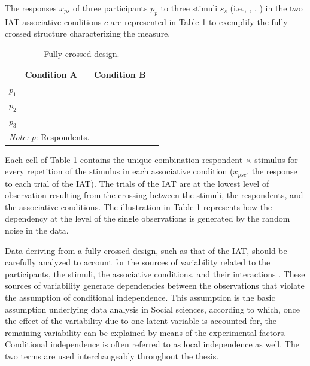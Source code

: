 \documentclass[12pt]{book}
\begin{document}
The responses $x_{ps}$ of three participants $p_p$ to three stimuli $s_s$ (i.e., \Cat, \Snowman[1.5], \NiceReapey) in the two IAT associative conditions $c$ are represented in Table \ref{tab:fully} to exemplify the fully-crossed structure characterizing the measure.  
\begin{table}[h!]
	\caption{Fully-crossed design.}
	\label{tab:fully} \centering \onehalfspacing
	\begin{tabular}{p{1cm} p{0.05cm} p{1.5cm} p{1.5cm} p{1.5cm} p{0.05cm} p{1.5cm} p{1.5cm} p{1.5cm}}
		\toprule
		& \multicolumn{3}{c}{Condition A} & & \multicolumn{3}{c}{Condition B}\\
		\midrule
		\multirow{2}{*}{$p_1$} &  \multicolumn{1}{|c}{} & \Cat[2] & \Snowman[2.5] & \NiceReapey[2] & &  \Cat[2]  & \Snowman[2.5] & \NiceReapey[2] \\
		&  \multicolumn{1}{|c}{} & \Cat[2] & \Snowman[2.5] & \NiceReapey[2] & & \Cat[2] & \Snowman[2.5] & \NiceReapey[2] \\
		\hline
		\multirow{2}{*}{$p_2$} &  \multicolumn{1}{|c}{} & \Cat[2] & \Snowman[2.5] & \NiceReapey[2] & & \Cat[2] & \Snowman[2.5] & \NiceReapey[2] \\
		& \multicolumn{1}{|c}{} & \Cat[2] & \Snowman[2.5] & \NiceReapey[2] & & \Cat[2] & \Snowman[2.5] & \NiceReapey[2] \\
		\hline
		\multirow{2}{*}{$p_3$} & \multicolumn{1}{|c}{} & \Cat[2] & \Snowman[2.5] & \NiceReapey[2] & & \Cat[2] & \Snowman[2.5] & \NiceReapey[2] \\
		& \multicolumn{1}{|c}{} & \Cat[2] & \Snowman[2.5] & \NiceReapey[2] & & \Cat[2] & \Snowman[2.5] & \NiceReapey[2] \\
		\bottomrule
		\multicolumn{8}{p{10cm}}{\emph{Note:} $p$: Respondents.}
	\end{tabular}
\end{table}
Each cell of Table \ref{tab:fully} contains the unique combination respondent $\times$ stimulus for every repetition of the stimulus in each associative condition ($x_{psc}$, the response to each  trial of the IAT). 
The trials of the IAT are at the lowest level of observation resulting from the crossing between the stimuli, the respondents, and the associative conditions.
The illustration in Table \ref{tab:fully} represents how the dependency at the level of the single observations is generated by the random noise in the data. 

Data deriving from a fully-crossed design, such as that of the IAT, should be carefully analyzed to account for the sources of variability related to the participants, the stimuli, the associative conditions, and their interactions \cite{Baayen2008, Barr2013, judd2017,  Westfall2014, wols2017}.  
These sources of variability generate dependencies between the observations that violate the assumption of conditional independence. 
This assumption is the basic assumption underlying data analysis in Social sciences, according to which, once the effect of the variability due to one latent variable is accounted for, the remaining variability can be explained by means of the experimental factors.
Conditional independence is often referred to as local independence as well. The two terms are used interchangeably throughout the thesis.
\end{document}
